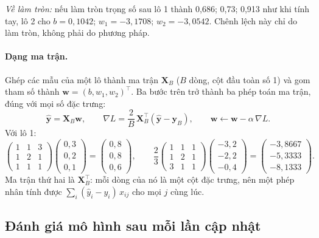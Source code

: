 \noindent\textit{Về làm tròn:} nếu làm tròn trọng số sau lô 1 thành 0,686; 0,73; 0,913 như khi tính tay, lô 2 cho $b = 0{,}1042$; $w_1 = -3{,}1708$; $w_2 = -3{,}0542$. Chênh lệch này chỉ do làm tròn, không phải do phương pháp.

\paragraph{Dạng ma trận.} Ghép các mẫu của một lô thành ma trận $\mathbf{X}_B$ ($B$ dòng, cột đầu toàn số 1) và gom tham số thành $\mathbf{w} = (b, w_1, w_2)^\top$. Ba bước trên trở thành ba phép toán ma trận, đúng với mọi số đặc trưng:
\begin{equation}
    \hat{\mathbf{y}} = \mathbf{X}_B\mathbf{w}, \qquad
    \nabla L = \frac{2}{B}\,\mathbf{X}_B^\top(\hat{\mathbf{y}} - \mathbf{y}_B), \qquad
    \mathbf{w} \leftarrow \mathbf{w} - \alpha\,\nabla L .
\end{equation}
Với lô 1:
\[
    \begin{pmatrix} 1 & 1 & 3 \\ 1 & 2 & 1 \\ 1 & 1 & 1 \end{pmatrix}
    \begin{pmatrix} 0{,}3 \\ 0{,}2 \\ 0{,}1 \end{pmatrix}
    = \begin{pmatrix} 0{,}8 \\ 0{,}8 \\ 0{,}6 \end{pmatrix}, \qquad
    \frac{2}{3}
    \begin{pmatrix} 1 & 1 & 1 \\ 1 & 2 & 1 \\ 3 & 1 & 1 \end{pmatrix}
    \begin{pmatrix} -3{,}2 \\ -2{,}2 \\ -0{,}4 \end{pmatrix}
    = \begin{pmatrix} -3{,}8667 \\ -5{,}3333 \\ -8{,}1333 \end{pmatrix}.
\]
Ma trận thứ hai là $\mathbf{X}_B^\top$: mỗi dòng của nó là một cột đặc trưng, nên một phép nhân tính được $\sum_i(\hat{y}_i - y_i)\,x_{ij}$ cho mọi $j$ cùng lúc.

\subsection{Đánh giá mô hình sau mỗi lần cập nhật}
\label{sec:minibatch-eval}

